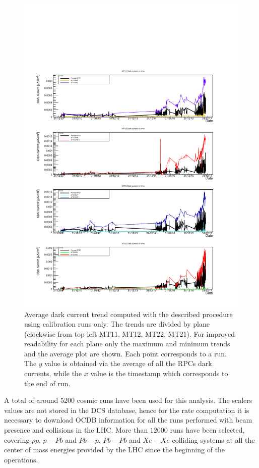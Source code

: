 \begin{figure}[!t]
\begin{center}
\includegraphics[width=0.95\linewidth]{Chapters/Performance/Figs/iDark_CALIB_minmax.pdf}
\caption{Average dark current trend computed with the described procedure using calibration runs only. The trends are divided by plane (clockwise from top left MT11, MT12, MT22, MT21). For improved readability for each plane only the maximum and minimum trends and the average plot are shown. Each point corresponds to a run. The $y$ value is obtained via the average of all the RPCs dark currents, while the $x$ value is the timestamp which corresponds to the end of run.}
\label{fig:iDarkCALIB}
\end{center}
\end{figure}

A total of around $5200$ cosmic runs have been used for this analysis.
The scalers values are not stored in the DCS database, hence for the rate computation it is necessary to download OCDB information for all the runs performed with beam presence and collisions in the LHC.
More than $12000$ runs have been selected, covering $pp$, $p-Pb$ and $Pb-p$, $Pb-Pb$ and $Xe-Xe$ colliding systems at all the center of mass energies provided by the LHC since the beginning of the operations.


